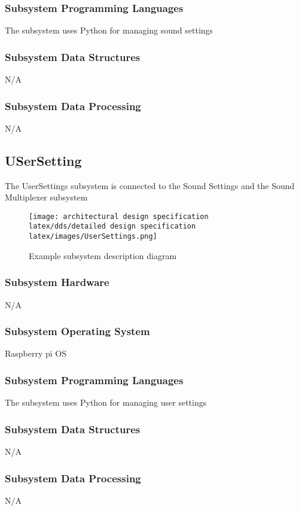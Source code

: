 \subsubsection{Subsystem Programming Languages}
 The subsystem uses Python for managing sound settings

\subsubsection{Subsystem Data Structures}
N/A

\subsubsection{Subsystem Data Processing}
N/A

\subsection{USerSetting}
The UserSettings subsystem is connected to the Sound Settings and the Sound Multiplexer subsystem

\begin{figure}[h!]
	\centering
 	\texttt{[image: architectural design specification latex/dds/detailed design specification latex/images/UserSettings.png]}
 \caption{Example subsystem description diagram}
\end{figure}


\subsubsection{Subsystem Hardware}
N/A

\subsubsection{Subsystem Operating System}
Raspberry pi OS 

 \subsubsection{Subsystem Programming Languages}
 The subsystem uses Python for managing user settings

\subsubsection{Subsystem Data Structures}
N/A

\subsubsection{Subsystem Data Processing}
N/A

